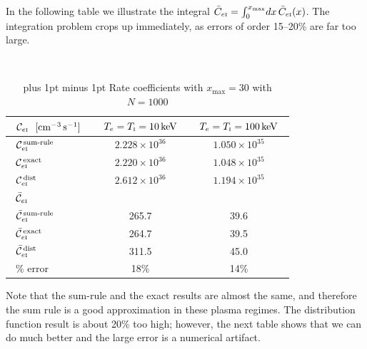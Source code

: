 \documentclass[preprint,12pt,eqsecnum,nofootinbib,amsmath,amssymb]{revtex4}
\newcommand{\smI}{{\rm\scriptscriptstyle I}}
\newcommand{\footnoteskip}{\baselineskip 12pt plus 1pt minus 1pt}
\begin{document}
\noindent
In the following table we illustrate the integral $\bar C_{e\smI} =
\int_0^{x_\text{max}} \!  dx\, \bar C_{e\smI}(x)$. The integration
problem crops up immediately, as errors of order 15--20\% are far too
large.

%
%
~
\begin{table}[hb!]
\caption{\footnoteskip 
  Rate coefficients with $x_\text{max}=30$ with $N=1000$
}
\begin{tabular}{|l||c|c|} \hline
   ~${\cal C}_{e\smI} ~~{\rm [cm^{-3} \,s^{-1}] }$~ & ~$T_e=T_\smI=10\,{\rm keV}$~     & ~$T_e=T_\smI=100\,{\rm keV}$~\\ \hline
   ~${\cal C}_{e\smI}^\text{\,sum-rule}$~             & ~$2.228 \times 10^{36}$~         & ~$1.050 \times 10^{35}$~     \\
   ~${\cal C}_{e\smI}^\text{\,exact}$~                & ~$2.220 \times 10^{36}$~         & ~$1.048 \times 10^{35}$~     \\
   ~${\cal C}_{e\smI}^\text{\,dist}$~                 & ~$2.612 \times 10^{36}$~         & ~$1.194 \times 10^{35}$~     \\\hline\hline
   ~$\bar{\cal C}_{e\smI} $~                        &      & \\\hline
   ~$\bar{\cal C}_{e\smI}^\text{\,sum-rule}$~         & ~265.7~         & ~39.6~     \\
   ~$\bar{\cal C}_{e\smI}^\text{\,exact}$~            & ~264.7~         & ~39.5~     \\
   ~$\bar{\cal C}_{e\smI}^\text{\,dist}$~             & ~311.5~         & ~45.0~     \\\hline
   ~\% error~                                         & ~18\%~          & ~14\%~     \\\hline
\end{tabular} 
\label{table:fractALP1}
\end{table}

\noindent
Note that the sum-rule and the exact results are almost the same, and
therefore the sum rule is a good approximation in these plasma
regimes. The distribution function result is about 20\% too high;
however, the next table shows that we can do much better and the large
error is a numerical artifact.
\end{document}
